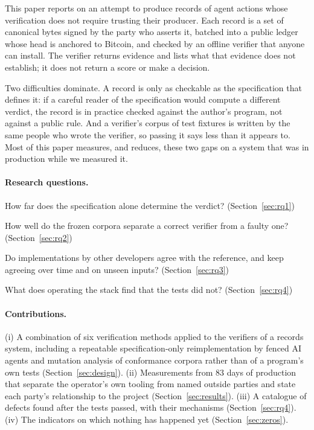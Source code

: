 \documentclass[11pt,a4paper]{article}
\begin{document}
This paper reports on an attempt to produce records of agent actions whose verification does not require trusting their producer. Each record is a set of canonical bytes signed by the party who asserts it, batched into a public ledger whose head is anchored to Bitcoin, and checked by an offline verifier that anyone can install. The verifier returns evidence and lists what that evidence does not establish; it does not return a score or make a decision.

Two difficulties dominate. A record is only as checkable as the specification that defines it: if a careful reader of the specification would compute a different verdict, the record is in practice checked against the author's program, not against a public rule. And a verifier's corpus of test fixtures is written by the same people who wrote the verifier, so passing it says less than it appears to. Most of this paper measures, and reduces, these two gaps on a system that was in production while we measured it.

\paragraph{Research questions.}
\begin{description}[leftmargin=3.2em,style=nextline]
\item[RQ1] How far does the specification alone determine the verdict? (Section~\ref{sec:rq1})
\item[RQ2] How well do the frozen corpora separate a correct verifier from a faulty one? (Section~\ref{sec:rq2})
\item[RQ3] Do implementations by other developers agree with the reference, and keep agreeing over time and on unseen inputs? (Section~\ref{sec:rq3})
\item[RQ4] What does operating the stack find that the tests did not? (Section~\ref{sec:rq4})
\end{description}

\paragraph{Contributions.} (i) A combination of six verification methods applied to the verifiers of a records system, including a repeatable specification-only reimplementation by fenced AI agents and mutation analysis of conformance corpora rather than of a program's own tests (Section~\ref{sec:design}). (ii) Measurements from 83 days of production that separate the operator's own tooling from named outside parties and state each party's relationship to the project (Section~\ref{sec:results}). (iii) A catalogue of defects found after the tests passed, with their mechanisms (Section~\ref{sec:rq4}). (iv) The indicators on which nothing has happened yet (Section~\ref{sec:zeros}).
\end{document}
